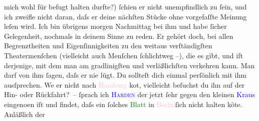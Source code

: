                mich wohl für befugt halten durfte?) ſchien er nicht unempfindlich zu ſein, und ich
               zweifle nicht daran, daſs er deine nächſten Stücke ohne vorgefaſſte Meinung leſen
               wird. Ich bin übrigens mor{\pb}gen Nachmittag bei ihm
               und habe ſicher Gelegenheit, nochmals in deinem Sinne zu reden. Er gehört doch, bei
               allen Begrenztheiten und Eigenſinnigkeiten zu den weitaus verſtändigſten
               Theatermenſchen \introOben{}(vielleicht auch Menſchen ſchlichtweg –)\introOben{},
               die es gibt, und iſt derjenige, mit dem man am gradlinigſten und verläßlichſten
               verkehren kann. Man darf von ihm ſagen, daſs {\pb}er nie lügt. Du
               sollteſt dich einmal perſönlich mit ihm ausſprechen. We{\geminationn}
               er nicht nach \textcolor{pink}{Hamburg}{}\ledrightnote{\textcolor{pink}{Hamburg}} ko{\geminationm}t, vielleicht beſuchst du ihn auf der Hin- oder Rückfahrt? – \pend
           \pstart
           \label{K_L01195_1v}\label{K_L01195_1h}{ }ſprach ich \textsc{\textcolor{blue}{Harden}{}\ledrightnote{\textcolor{blue}{Maximilian Harden}}}\damage{,} der jetzt ſehr gegen den kleinen \textcolor{blue}{Kraus}{}\ledrightnote{\textcolor{blue}{Karl Kraus}}
                  eingeno{\geminationm}en iſt und findet, daſs ein ſolches \textcolor{green}{Blatt}{} in \textcolor{pink}{Berlin}{}\ledrightnote{\textcolor{pink}{Berlin}}{ }ſich nicht halten kö{\geminationn}te. {\pb}Anläßlich der
